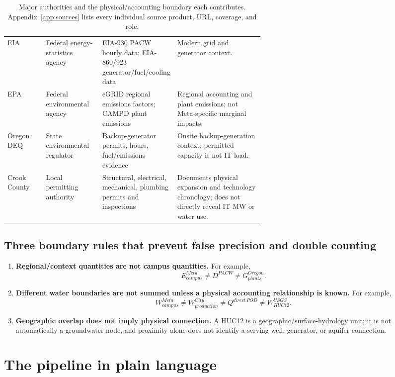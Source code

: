 \documentclass[11pt]{article}
\begin{document}
\begin{table}[ht]
\begin{tabularx}{\linewidth}{@{}p{0.15\linewidth}p{0.22\linewidth}p{0.23\linewidth}Y@{}}
EIA & Federal energy-statistics agency & EIA-930 PACW hourly data; EIA-860/923 generator/fuel/cooling data & Modern grid and generator context. \\
EPA & Federal environmental agency & eGRID regional emissions factors; CAMPD plant emissions & Regional accounting and plant emissions; not Meta-specific marginal impacts. \\
Oregon DEQ & State environmental regulator & Backup-generator permits, hours, fuel/emissions evidence & Onsite backup-generation context; permitted capacity is not IT load. \\
Crook County & Local permitting authority & Structural, electrical, mechanical, plumbing permits and inspections & Documents physical expansion and technology chronology; does not directly reveal IT MW or water use. \\
\bottomrule
\end{tabularx}
\caption{Major authorities and the physical/accounting boundary each contributes. Appendix~\ref{app:sources} lists every individual source product, URL, coverage, and role.}
\end{table}

\subsection*{Three boundary rules that prevent false precision and double counting}

\begin{enumerate}
\item \textbf{Regional/context quantities are not campus quantities.}
For example,
\[
E^{Meta}_{campus}\neq D^{PACW}\neq G^{Oregon}_{plants}.
\]

\item \textbf{Different water boundaries are not summed unless a physical accounting relationship is known.}
For example,
\[
W^{Meta}_{campus}
\neq
W^{City}_{production}
\neq
Q^{direct\,POD}
\neq
W^{USGS}_{HUC12}.
\]

\item \textbf{Geographic overlap does not imply physical connection.}
A HUC12 is a geographic/surface-hydrology unit; it is not automatically a groundwater node, and proximity alone does not identify a serving well, generator, or aquifer connection.
\end{enumerate}

\section{The pipeline in plain language}
\end{document}
